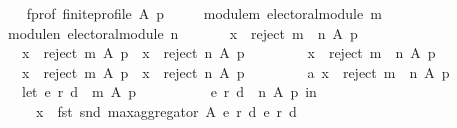 \begin{isabellebody}
\ \ \isanewline
\ \ \ \ f{\isacharunderscore}{\kern0pt}prof{\isacharcolon}{\kern0pt}\ {\isachardoublequoteopen}finite{\isacharunderscore}{\kern0pt}profile\ A\ p{\isachardoublequoteclose}\ \isanewline
\ \ \ \ module{\isacharunderscore}{\kern0pt}m{\isacharcolon}{\kern0pt}\ {\isachardoublequoteopen}electoral{\isacharunderscore}{\kern0pt}module\ m{\isachardoublequoteclose}\ \isanewline
\ \ \ \ module{\isacharunderscore}{\kern0pt}n{\isacharcolon}{\kern0pt}\ {\isachardoublequoteopen}electoral{\isacharunderscore}{\kern0pt}module\ n{\isachardoublequoteclose}\isanewline
\ \ \isanewline
\ \ \ \ {\isachardoublequoteopen}x\ {\isasymin}\ reject\ {\isacharparenleft}{\kern0pt}m\ {\isasymparallel}\isactrlsub {\isasymup}\ n{\isacharparenright}{\kern0pt}\ A\ p\ {\isasymlongleftrightarrow}\isanewline
\ \ \ \ \ \ {\isacharparenleft}{\kern0pt}x\ {\isasymin}\ reject\ m\ A\ p\ {\isasymand}\ x\ {\isasymin}\ reject\ n\ A\ p{\isacharparenright}{\kern0pt}{\isachardoublequoteclose}\isanewline
%
\isadelimproof
%
\endisadelimproof
%
\isatagproof
{}\isamarkupfalse%
\ {\isacharminus}{\kern0pt}\isanewline
\ \ \isamarkupfalse%
\isanewline
\ \ \ \ {\isachardoublequoteopen}x\ {\isasymin}\ reject\ {\isacharparenleft}{\kern0pt}m\ {\isasymparallel}\isactrlsub {\isasymup}\ n{\isacharparenright}{\kern0pt}\ A\ p\ {\isasymlongrightarrow}\isanewline
\ \ \ \ \ \ {\isacharparenleft}{\kern0pt}x\ {\isasymin}\ reject\ m\ A\ p\ {\isasymand}\ x\ {\isasymin}\ reject\ n\ A\ p{\isacharparenright}{\kern0pt}{\isachardoublequoteclose}\isanewline
\ \ \isamarkupfalse%
\isanewline
\ \ \ \ \isamarkupfalse%
\ a{\isacharcolon}{\kern0pt}\ {\isachardoublequoteopen}x\ {\isasymin}\ reject\ {\isacharparenleft}{\kern0pt}m\ {\isasymparallel}\isactrlsub {\isasymup}\ n{\isacharparenright}{\kern0pt}\ A\ p{\isachardoublequoteclose}\isanewline
\ \ \ \ \isamarkupfalse%
\isanewline
\ \ \ \ \ \ {\isachardoublequoteopen}let\ {\isacharparenleft}{\kern0pt}e{}{\isacharcomma}{\kern0pt}\ r{}{\isacharcomma}{\kern0pt}\ d{}{\isacharparenright}{\kern0pt}\ {\isacharequal}{\kern0pt}\ m\ A\ p{\isacharsemicolon}{\kern0pt}\isanewline
\ \ \ \ \ \ \ \ \ \ {\isacharparenleft}{\kern0pt}e{}{\isacharcomma}{\kern0pt}\ r{}{\isacharcomma}{\kern0pt}\ d{}{\isacharparenright}{\kern0pt}\ {\isacharequal}{\kern0pt}\ n\ A\ p\ in\isanewline
\ \ \ \ \ \ \ \ x\ {\isasymin}\ fst\ {\isacharparenleft}{\kern0pt}snd\ {\isacharparenleft}{\kern0pt}max{\isacharunderscore}{\kern0pt}aggregator\ A\ {\isacharparenleft}{\kern0pt}e{}{\isacharcomma}{\kern0pt}\ r{}{\isacharcomma}{\kern0pt}\ d{}{\isacharparenright}{\kern0pt}\ {\isacharparenleft}{\kern0pt}e{}{\isacharcomma}{\kern0pt}\ r{}{\isacharcomma}{\kern0pt}\ d{}{\isacharparenright}{\kern0pt}{\isacharparenright}{\kern0pt}{\isacharparenright}{\kern0pt}{\isachardoublequoteclose}\isanewline

\end{isabellebody}
